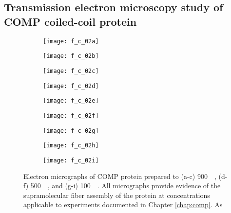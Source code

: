 \begin{refsection}
\section{Transmission electron microscopy study of COMP coiled-coil protein}
\label{sec:comp_tem_results}
\begin{figure}
    \centering
    \begin{subfigure}[b]{0.31\textwidth}
        \texttt{[image: f\_c\_02a]}
        \caption{}
    \end{subfigure}
    \begin{subfigure}[b]{0.31\textwidth}
        \texttt{[image: f\_c\_02b]}
        \caption{}
    \end{subfigure}
    \begin{subfigure}[b]{0.31\textwidth}
        \texttt{[image: f\_c\_02c]}
        \caption{}
    \end{subfigure}
    \begin{subfigure}[b]{0.31\textwidth}
        \texttt{[image: f\_c\_02d]}
        \caption{}
    \end{subfigure}
    \begin{subfigure}[b]{0.31\textwidth}
        \texttt{[image: f\_c\_02e]}
        \caption{}
    \end{subfigure}
    \begin{subfigure}[b]{0.31\textwidth}
        \texttt{[image: f\_c\_02f]}
        \caption{}
    \end{subfigure}
    \begin{subfigure}[b]{0.31\textwidth}
        \texttt{[image: f\_c\_02g]}
        \caption{}
    \end{subfigure}
    \begin{subfigure}[b]{0.31\textwidth}
        \texttt{[image: f\_c\_02h]}
        \caption{}
    \end{subfigure}
    \begin{subfigure}[b]{0.31\textwidth}
        \texttt{[image: f\_c\_02i]}
        \caption{}
    \end{subfigure}
    \caption{Electron micrographs of COMP protein prepared to (a-c)
        \SI{900}{\micro\moLar}, (d-f) \SI{500}{\micro\moLar}, and
        (g-i) \SI{100}{\micro\moLar}. All micrographs provide evidence of the
    supramolecular fiber assembly of the protein at concentrations applicable to
     experiments documented in Chapter \ref{chap:comp}. As
}
\end{figure}
\end{refsection}
